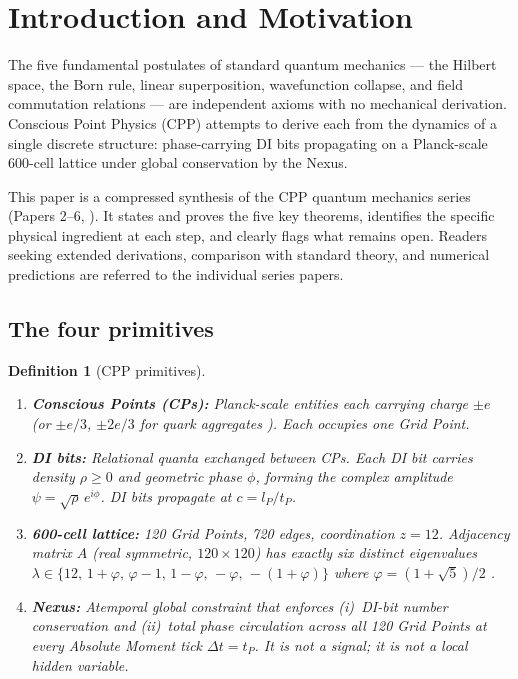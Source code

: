 \documentclass[11pt,a4paper]{article}
\newtheorem{definition}[theorem]{Definition}
\newcommand{\lP}{l_P}
\newcommand{\tP}{t_P}
\begin{document}
\tableofcontents
\newpage

\section{Introduction and Motivation}

The five fundamental postulates of standard quantum mechanics — the
Hilbert space, the Born rule, linear superposition, wavefunction collapse,
and field commutation relations — are independent axioms with no
mechanical derivation. Conscious Point Physics (CPP) attempts to derive
each from the dynamics of a single discrete structure: phase-carrying
DI bits propagating on a Planck-scale 600-cell lattice under global
conservation by the Nexus.

This paper is a compressed synthesis of the CPP quantum mechanics series
(Papers 2--6, \citep{cpp2040a,cpp2040b,cpp2040c,cpp2040d,cpp2040e}).
It states and proves the five key theorems, identifies the specific
physical ingredient at each step, and clearly flags what remains open.
Readers seeking extended derivations, comparison with standard theory,
and numerical predictions are referred to the individual series papers.

\subsection{The four primitives}

\begin{definition}[CPP primitives]
\label{def:primitives}
\hfill
\begin{enumerate}
\item \textbf{Conscious Points (CPs):} Planck-scale entities each
  carrying charge $\pm e$ (or $\pm e/3$, $\pm 2e/3$ for quark
  aggregates \citep{cpp5014}). Each occupies one Grid Point.
\item \textbf{DI bits:} Relational quanta exchanged between CPs. Each
  DI bit carries density $\rho \ge 0$ and geometric phase $\phi$,
  forming the complex amplitude $\psi = \sqrt{\rho}\,e^{i\phi}$. DI
  bits propagate at $c = \lP/\tP$.
\item \textbf{600-cell lattice:} 120 Grid Points, 720 edges,
  coordination $z = 12$. Adjacency matrix $A$ (real symmetric,
  $120\times120$) has exactly six distinct eigenvalues
  $\lambda \in \{12,\, 1+\varphi,\, \varphi-1,\, 1-\varphi,\,
  -\varphi,\, -(1+\varphi)\}$ where $\varphi = (1+\sqrt5)/2$
  \citep{brouwer1989}.
\item \textbf{Nexus:} Atemporal global constraint that enforces
  (i)~DI-bit number conservation and (ii)~total phase circulation
  across all 120 Grid Points at every Absolute Moment tick $\Delta t
  = \tP$. It is not a signal; it is not a local hidden variable.
\end{enumerate}
\end{definition}
\end{document}
